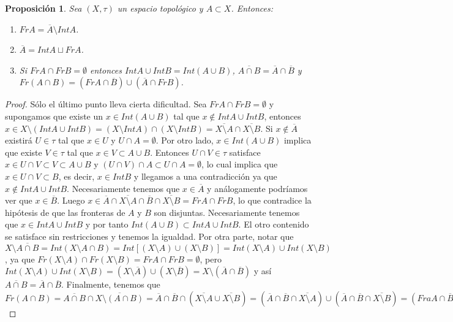 \documentclass[12pt]{article}
\newtheorem{proposition}[theorem]{Proposición}
\begin{document}
\begin{proposition}Sea $(X, \tau)$ un espacio topológico y $A \subset X$. Entonces: \begin{enumerate}
\item $Fr A = \overline{A} \setminus Int A$.
\item $\overline{A} = Int A \sqcup Fr A$.
\item Si $FrA \cap Fr B = \emptyset$ entonces $Int A \cup Int B = Int(A \cup B)$, $\overline{A \cap B} = \overline{A} \cap \overline{B}$ y $Fr(A \cap B) = (Fr A\cap \overline{B})\cup (\overline{A} \cap Fr B)$.
\end{enumerate}
\end{proposition}
\begin{proof}
Sólo el último punto lleva cierta dificultad. Sea $Fr A \cap Fr B = \emptyset$ y supongamos que existe un $x \in Int (A \cup B)$ tal que $x \notin Int A \cup Int B$, entonces $x \in X \setminus (Int A \cup Int B) = (X \setminus Int A) \cap (X \setminus Int B) = \overline{X\setminus A} \cap \overline{X\setminus B}$. Si $x \notin \overline{A}$ existirá $U \in \tau$ tal que $x \in U$ y $U \cap A = \emptyset$. Por otro lado, $x \in Int (A \cup B)$ implica que existe $V \in \tau$ tal que $x \in V \subset A \cup B$. Entonces $U \cap V \in \tau$ satisface $x \in U \cap V \subset V \subset A \cup B$ y $(U \cap V) \cap A \subset U \cap A = \emptyset$, lo cual implica que $x \in U \cap V \subset B$, es decir, $x \in Int B$ y llegamos a una contradicción ya que $x \notin Int A \cup Int B$. Necesariamente tenemos que $x \in \overline{A}$ y análogamente podríamos ver que $x \in \overline{B}$. Luego $x \in \overline{A} \cap \overline{X \setminus A} \cap \overline{B} \cap \overline{X \setminus B} = Fr A \cap Fr B$, lo que contradice la hipótesis de que las fronteras de $A$ y $B$ son disjuntas. Necesariamente tenemos que $x \in Int A \cup Int B$ y por tanto $Int (A \cup B) \subset Int A \cup Int B$. El otro contenido se satisface sin restricciones y tenemos la igualdad. Por otra parte, notar que $X \setminus \overline{A \cap B} = Int (X \setminus A \cap B) = Int[(X\setminus A) \cup (X \setminus B)] = Int (X\setminus A ) \cup Int (X \setminus B)$, ya que $Fr (X \setminus A) \cap Fr(X\setminus B) = Fr A \cap Fr B = \emptyset$, pero $Int (X\setminus A) \cup Int (X\setminus B) =(X\setminus \overline{A})\cup (X  \setminus \overline{B}) = X \setminus (\overline{A} \cap \overline{B})$ y así $\overline{A \cap B} = \overline{A} \cap \overline{B}$. Finalmente, tenemos que $Fr (A \cap B) = \overline{A \cap B} \cap \overline{X \setminus (A \cap B)} = \overline{A} \cap \overline{B} \cap (\overline{X\setminus A} \cup \overline{X \setminus B}) = (\overline{A}\cap \overline{B} \cap \overline{X\setminus A})\cup (\overline{A} \cap \overline{B} \cap \overline{X \setminus B}) = (Fra A \cap \overline{B})  \cup (\overline{A} \cap FrB).$

\end{proof}
\end{document}
